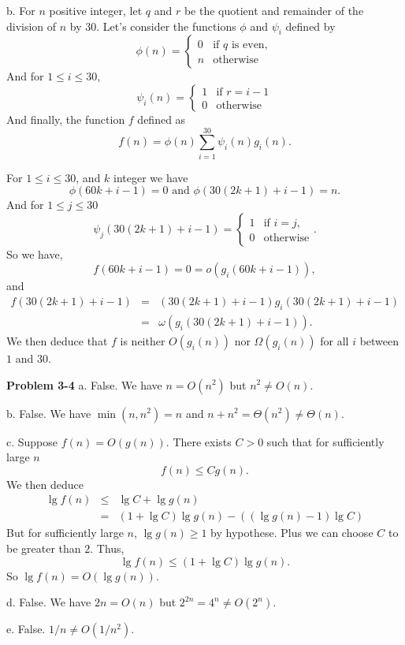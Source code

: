 \documentclass[a4paper,12pt]{article}
\newcommand{\newprob}[1]
{\bigskip \noindent \textbf{Problem #1} \newline}
\newcommand{\subpar}[1]
{\medskip \noindent #1.}
\begin{document}
\medskip \noindent
b. For $n$ positive integer, let $q$ and $r$ be the quotient and
remainder of the division of $n$ by $30$.
Let's consider the functions $\phi$ and $\psi_i$ defined by
\[ \phi(n) = \left\{
\begin{array}{cl}
0 & \mbox{if $q$ is even}, \\
n & \mbox{otherwise}
\end{array}\right.\]
And for $1 \le i \le 30$,
\[ \psi_i(n) = \left\{
\begin{array}{cl}
1 & \mbox{if $r = i-1$} \\
0 & \mbox{otherwise}
\end{array} \right. \]
And finally, the function $f$ defined as
\[ f(n) = \phi(n) \sum_{i=1}^{30} \psi_i(n) g_i(n) .\]

For $1 \le i \le 30$, and $k$ integer we have
\[ \phi(60 k + i-1) = 0 \mbox{ and } 
\phi(30(2k+1)+i-1) = n.\]
And for $1 \le j \le 30$
\[ \psi_j(30(2k+1)+i-1) = \left\{
\begin{array}{cl}
1 & \mbox{if $i = j$}, \\
0 & \mbox{otherwise}
\end{array} \right. .\]
So we have,
\[ f(60k+i-1) = 0 = o(g_i(60k+i-1)), \]
and
\begin{eqnarray*}
f(30(2k+1)+i-1) &=& (30(2k+1)+i-1)g_i(30(2k+1)+i-1) \\
&=& \omega(g_i(30(2k+1)+i-1)).
\end{eqnarray*}
We then deduce that $f$ is neither $O(g_i(n))$ nor $\Omega(g_i(n))$
for all $i$ between $1$ and $30$.

\newprob{3-4}
\subpar{a} False.  We have $n = O(n^2)$ but $n^2 \not= O(n)$.

\subpar{b} False. We have $\min(n, n^2) = n$ and $n + n^2 =
\Theta(n^2) \not= \Theta(n)$.

\subpar{c} Suppose $f(n) = O(g(n))$.  There exists $C > 0$ such that
for sufficiently large $n$
\[ f(n) \le C g(n).\]
We then deduce
\begin{eqnarray*}
\lg f(n) &\le& \lg C + \lg g(n) \\
&=& (1+\lg C)\lg g(n) - ((\lg g(n) - 1) \lg C)
\end{eqnarray*}
But for sufficiently large $n$, $\lg g(n) \ge 1$ by hypothese.  Plus
we can choose $C$ to be greater than $2$. Thus,
\[ \lg f(n) \le (1+\lg C)\lg g(n).\]
So $\lg f(n) = O(\lg g(n))$.

\subpar{d} False.  We have $2n = O(n)$ but $2^{2n} = 4^n \not=
O(2^n)$.

\subpar{e} False.  $1/n \not= O(1/n^2)$.
\end{document}
